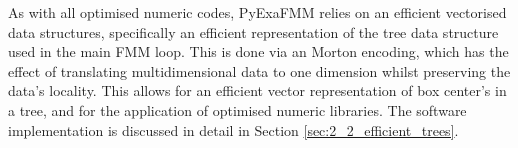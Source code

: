 As with all optimised numeric codes, \gls{PyExaFMM} relies on an efficient
vectorised data structures, specifically an efficient representation of the tree
data structure used in the main \gls{FMM} loop. This is done via an Morton encoding,
which has the effect of translating multidimensional data to one dimension whilst
preserving the data's locality. This allows for an efficient vector representation
of box center's in a tree, and for the application of optimised numeric libraries.
The software implementation is discussed in detail in Section \ref{sec:2_2_efficient_trees}.
